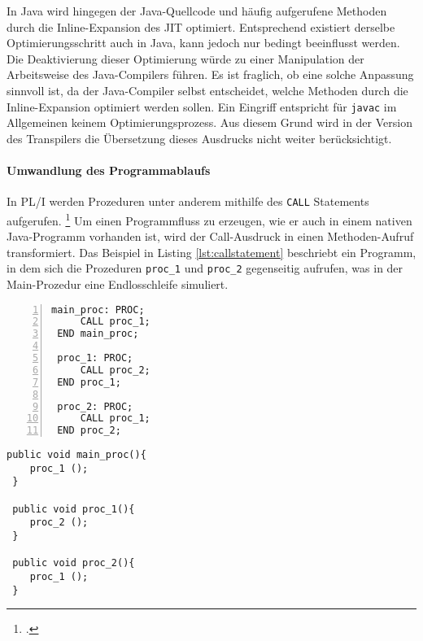In Java wird hingegen der Java-Quellcode und häufig aufgerufene Methoden durch die Inline-Expansion des \ac{JIT} optimiert. Entsprechend existiert derselbe Optimierungsschritt auch in Java, kann jedoch nur bedingt beeinflusst werden. Die Deaktivierung dieser Optimierung würde zu einer Manipulation der Arbeitsweise des Java-Compilers führen. Es ist fraglich, ob eine solche Anpassung sinnvoll ist, da der Java-Compiler selbst entscheidet, welche Methoden durch die Inline-Expansion optimiert werden sollen. Ein Eingriff entspricht für \verb+javac+ im Allgemeinen keinem Optimierungsprozess.
Aus diesem Grund wird in der Version des Transpilers die Übersetzung dieses Ausdrucks nicht weiter berücksichtigt.

\paragraph*{Umwandlung des Programmablaufs}

In PL/I werden Prozeduren unter anderem mithilfe des \verb+CALL+ Statements aufgerufen. \footcite[Vgl. ][S.133ff. ]{pliref} Um einen Programmfluss zu erzeugen, wie er auch in einem nativen Java-Programm vorhanden ist, wird der Call-Ausdruck in einen Methoden-Aufruf transformiert. 
Das Beispiel in Listing \ref{lst:callstatement} beschriebt ein Programm, in dem sich die Prozeduren \verb+proc_1+ und \verb+proc_2+ gegenseitig aufrufen, was in der Main-Prozedur eine Endlosschleife simuliert.

\begin{minipage}[b]{0.48\linewidth}
	\centering
	\lstset{language=PL/I,label=SliceExaple}
	\begin{lstlisting}[frame=single, numbers=left, mathescape,%
		caption={Transformation Prozeduraufrufe}, label={lst:callstatement},
		basicstyle=\fontsize{9}{13}\selectfont\ttfamily]
 main_proc: PROC;
	 CALL proc_1;
 END main_proc;
		
 proc_1: PROC;
	 CALL proc_2;
 END proc_1;
		
 proc_2: PROC;
	 CALL proc_1;
 END proc_2;
	\end{lstlisting}
\end{minipage}
\hspace{0.5cm}
\begin{minipage}[b]{0.48\linewidth}
	\centering
	\lstset{language=Java,label=SliceExaple}
	\begin{lstlisting}[frame=single, mathescape,%
		title={" "},
		basicstyle=\fontsize{9}{13}\selectfont\ttfamily]
 public void main_proc(){
 	proc_1 ();
 }
		
 public void proc_1(){
	proc_2 ();
 }
		
 public void proc_2(){
	proc_1 ();
 }
	\end{lstlisting}
\end{minipage}


